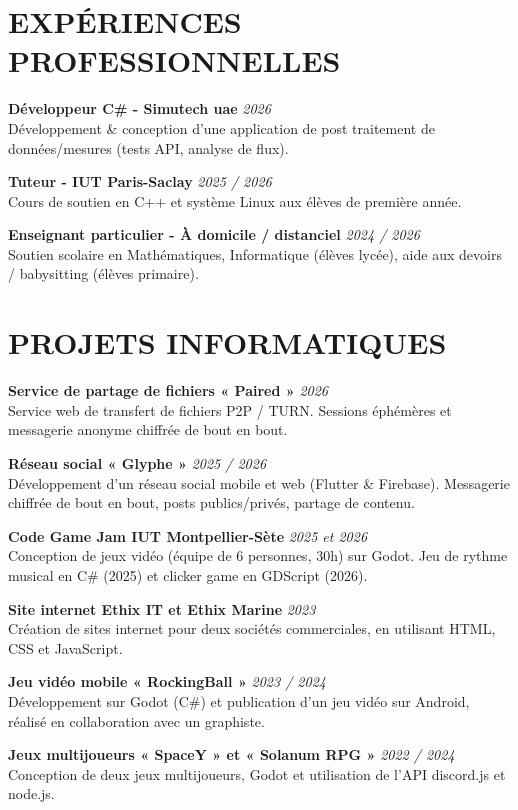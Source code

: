\documentclass[10pt,a4paper]{article}
\newcommand{\entry}[3]{%
  \textbf{#1} \hfill \textit{\small #2}\\
  \small #3\par\vspace{8pt}
}
\begin{document}
\begin{minipage}[t]{0.67\linewidth}
\vspace{0pt}

\section*{EXPÉRIENCES PROFESSIONNELLES}

\entry{Développeur C\# - Simutech uae}{2026}{Développement \& conception d'une application de post traitement de données/mesures (tests API, analyse de flux).}

\entry{Tuteur - IUT Paris-Saclay}{2025 / 2026}{Cours de soutien en C++ et système Linux aux élèves de première année.}

\entry{Enseignant particulier - À domicile / distanciel}{2024 / 2026}{Soutien scolaire en Mathématiques, Informatique (élèves lycée), aide aux devoirs / babysitting (élèves primaire).}

\vspace{14pt}
\section*{PROJETS INFORMATIQUES}

\entry{Service de partage de fichiers « Paired »}{2026}{Service web de transfert de fichiers P2P / TURN. Sessions éphémères et messagerie anonyme chiffrée de bout en bout.}

\entry{Réseau social « Glyphe »}{2025 / 2026}{Développement d'un réseau social mobile et web (Flutter \& Firebase). Messagerie chiffrée de bout en bout, posts publics/privés, partage de contenu.}

\entry{Code Game Jam IUT Montpellier-Sète}{2025 et 2026}{Conception de jeux vidéo (équipe de 6 personnes, 30h) sur Godot. Jeu de rythme musical en C\# (2025) et clicker game en GDScript (2026).}

\entry{Site internet Ethix IT et Ethix Marine}{2023}{Création de sites internet pour deux sociétés commerciales, en utilisant HTML, CSS et JavaScript.}

\entry{Jeu vidéo mobile « RockingBall »}{2023 / 2024}{Développement sur Godot (C\#) et publication d'un jeu vidéo sur Android, réalisé en collaboration avec un graphiste.}

\entry{Jeux multijoueurs « SpaceY » et « Solanum RPG »}{2022 / 2024}{Conception de deux jeux multijoueurs, Godot et utilisation de l'API discord.js et node.js.}

\vspace{14pt}

\end{minipage}
\end{document}
